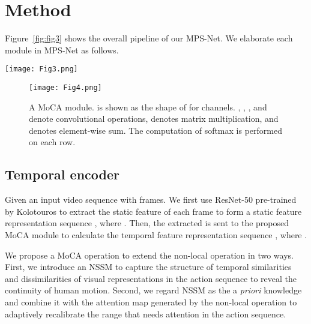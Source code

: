 \documentclass[10pt,twocolumn,letterpaper]{article}
\begin{document}
\vspace{-3pt}
\section{Method}\vspace{-3pt}
Figure~\ref{fig:fig3} shows the overall pipeline of our MPS-Net. We elaborate each module in MPS-Net as follows.\vspace{-2pt}

\begin{figure*}[t]
  \centering
  \texttt{[image: Fig3.png]}\vspace{-11pt}
  \caption{Overview of our motion pose and shape network (MPS-Net). MPS-Net estimates pose, shape, and camera parameters  in the video sequence based on the static feature extractor, temporal encoder, temporal feature integration, and SMPL parameter regressor to generate 3D human pose and shape.}\vspace{-13pt}
  \label{fig:fig3}
\end{figure*}

\begin{figure}
  \centering
  \texttt{[image: Fig4.png]}\vspace{-7pt}
  \caption{A MoCA module.  is shown as the shape of  for  channels. , , , and  denote convolutional operations,  denotes matrix multiplication, and  denotes element-wise sum. The computation of softmax is performed on each row.}\vspace{-13pt}
  \label{fig:fig4}
\end{figure}

\vspace{-3pt}
\subsection{Temporal encoder}\vspace{-3pt}
Given an input video sequence  with  frames. We first use ResNet-50 \cite{He2016DeepRL} pre-trained by Kolotouros \etal \cite{Kolotouros2019LearningTR} to extract the static feature of each frame to form a static feature representation sequence , where . Then, the extracted  is sent to the proposed MoCA module to calculate the temporal feature representation sequence , where .\vspace{4pt}

 We propose a MoCA operation to extend the non-local operation \cite{Wang2018NonlocalNN} in two ways. First, we introduce an NSSM to capture the structure of temporal similarities and dissimilarities of visual representations in the action sequence to reveal the continuity of human motion. Second, we regard NSSM as the a \emph{priori} knowledge and combine it with the attention map generated by the non-local operation to adaptively recalibrate the range that needs attention in the action sequence.\vspace{-2pt}
\end{document}
